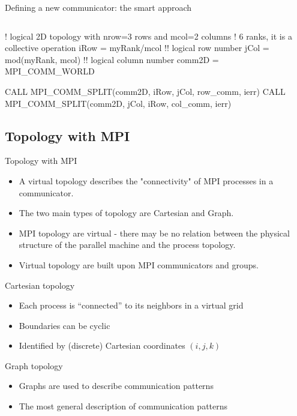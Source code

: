 \documentclass[aspectratio=43]{beamer}
\begin{document}
\begin{frame}[fragile]{Defining a new communicator: the smart approach}
\begin{columns}
\end{columns}
\begin{Fortranlisting}[]{}
! logical 2D topology with nrow=3 rows and mcol=2 columns
! 6 ranks, it is a collective operation
iRow = myRank/mcol       !! logical row number
jCol = mod(myRank, mcol) !! logical column number
comm2D = MPI_COMM_WORLD

CALL MPI_COMM_SPLIT(comm2D, iRow, jCol, row_comm, ierr)
CALL MPI_COMM_SPLIT(comm2D, jCol, iRow, col_comm, ierr)
\end{Fortranlisting}
\end{frame}


\subsection{Topology with MPI}
\begin{frame}[fragile]{Topology with MPI}
\begin{itemize}
\item A virtual topology describes the "connectivity" of MPI processes in a communicator.
\item The two main types of topology are Cartesian and Graph.
\item MPI topology are virtual - there may be no relation between the physical structure of the parallel machine and the process topology.
\item Virtual topology are built upon MPI communicators and groups.
\end{itemize}
\begin{blue1block}{Cartesian topology}
\begin{itemize}
\item Each process is “connected” to its neighbors in a virtual grid
\item Boundaries can be cyclic
\item Identified by (discrete) Cartesian coordinates $(i, j, k)$
\end{itemize}
\end{blue1block}
\begin{blue1block}{Graph topology}
\begin{itemize}
\item Graphs are used to describe communication patterns
\item The most general description of communication patterns
\end{itemize}
\end{blue1block}
\end{frame}
\end{document}
